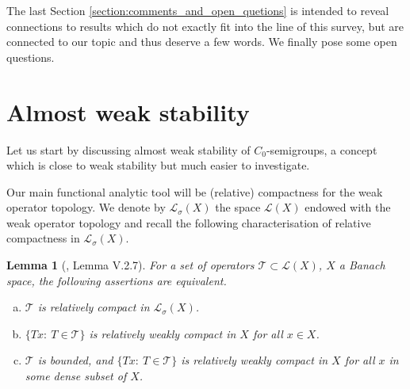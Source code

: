 \documentclass[11pt,intlimits, draft,oneside]{amsart}
\newtheorem{lemma}[thm]{Lemma}
\theoremstyle{definition}
\def\LLL{\mathcal{L}}
\begin{document}
\smallskip

The last Section \ref{section:comments_and_open_quetions} is
intended to reveal connections to results which do not exactly fit
into the line of this survey, but are connected to our topic and
thus deserve a few words.  We finally pose some open questions.


\section{Almost  weak stability} \label{section:characterization}

Let us start by discussing almost weak stability of
$C_0$-semigroups, a concept which is close to weak stability but
much easier to investigate.

Our main functional analytic tool will be (relative) compactness for
the weak operator topology. We denote by $\LLL_\sigma(X)$ the space
$\LLL(X)$ endowed with the weak operator topology and recall the
following characterisation of relative compactness in
$\LLL_\sigma(X)$.

\begin{lemma}[{\cite{engel/nagel:2000}, Lemma V.2.7}] \label{weakcomp}
For a set of operators $\mathcal{T}\subset \LLL(X)$, $X$ a Banach
space, the following assertions are equivalent.
\begin{enumerate}[(a)]
\item $\mathcal{T}$ is relatively compact in $\LLL_\sigma(X)$.
\item $\{Tx:\:T\in \mathcal{T}\}$ is relatively weakly compact in $X$ for all $x\in X$.
\item $\mathcal{T}$ is bounded, and  $\{Tx:\:T\in \mathcal{T}\}$ is relatively weakly compact in $X$ for all $x$ in some dense subset of $X$.
\end{enumerate}
\end{lemma}
\end{document}
